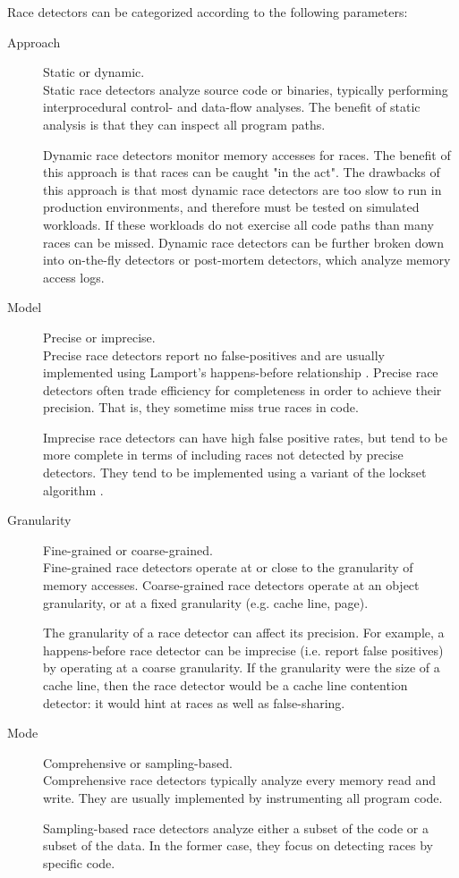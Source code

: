 \documentclass{sig-alternate}
\begin{document}
Race detectors can be categorized according to the following parameters:
\begin{description}
\item[Approach] Static or dynamic. \hfill \\
Static race detectors analyze source code or binaries, typically performing interprocedural control-
and data-flow analyses. The benefit of static analysis is that they can inspect all program paths.

Dynamic race detectors monitor memory accesses for races. The benefit of this approach is that
races can be caught "in the act". The drawbacks of this approach is that most dynamic race detectors
are too slow to run in production environments, and therefore must be tested on simulated workloads.
If these workloads do not exercise all code paths than many races can be missed. Dynamic race detectors
can be further broken down into on-the-fly detectors or post-mortem detectors, which analyze memory
access logs.

\item[Model] Precise or imprecise.  \hfill \\
Precise race detectors report no false-positives and are usually implemented using Lamport's
happens-before relationship \cite{VectorClocks}. Precise race detectors often trade efficiency
for completeness in order to achieve their precision. That is, they sometime miss true races in
code.

Imprecise race detectors can have high false positive rates, but tend to be more complete in terms of
including races not detected by precise detectors. They tend to be implemented using a variant of the
lockset algorithm \cite{Eraser}.

\item[Granularity] Fine-grained or coarse-grained. \hfill \\
Fine-grained race detectors operate at or close to the granularity of memory accesses. Coarse-grained
race detectors operate at an object granularity, or at a fixed granularity (e.g. cache line, page).

The granularity of a race detector can affect its precision. For example, a happens-before race detector 
can be imprecise (i.e. report false positives) by operating at a coarse granularity. If the granularity were
the size of a cache line, then the race detector would be a cache line contention detector: it would hint
at races as well as false-sharing.

\item[Mode] Comprehensive or sampling-based. \hfill \\
Comprehensive race detectors typically analyze every memory read and write. They are usually implemented
by instrumenting all program code.

Sampling-based race detectors analyze either a subset of the code or a subset of the data. In the former
case, they focus on detecting races by specific code.
\end{description}
\end{document}
